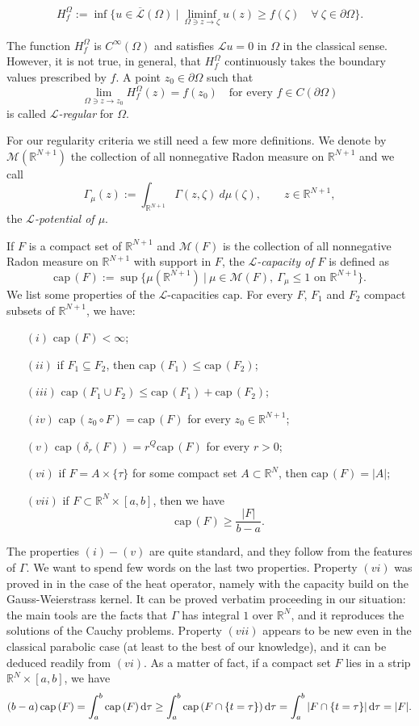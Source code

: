 \documentclass[10pt]{amsart}
\def \RN {\mathbb{R}^N}
\def\elle{\mathcal{L}}
\def\erre{\mathbb{R}}
\def \emme {{\mathcal {M}}}
\def\erreu{{\erre^{ {N+1} }}}
\def\capp{\mathrm{cap\, }}
\newcommand{\tende}{\rightarrow}
\numberwithin{equation}{section}
\begin{document}
$$H_f^\Omega:= \inf\{ u\in {\overline{\elle}} (\Omega) \ | \ \liminf_{\Omega\ni z\tende \zeta} u(z) \geq f(\zeta)\quad \forall\ \zeta\in \partial\Omega\}.$$

The function $H_f^\Omega$ is $C^\infty(\Omega)$ and satisfies $\elle u=0$ in $\Omega$ in the classical sense. However, it is not true, in general, that $H_f^\Omega$ continuously takes the boundary  values prescribed by $f$. A point $z_0\in\partial\Omega$ such that 
 $$\lim_{\Omega\ni z\tende z_0} H_f^\Omega(z)=f(z_0)\quad\mbox{for every }  f\in C(\partial\Omega)$$ is called {\it $\elle$-regular} for $\Omega$.

For our regularity criteria we still need a few more definitions. We denote by $\emme(\erreu)$ the collection of all nonnegative Radon measure on $\erreu$ and we call 
$$\Gamma_\mu(z) :=\int_\erreu \Gamma(z,\zeta)\ d\mu(\zeta),\qquad z\in \erreu,$$ the {\it $\elle$-potential of $\mu$}. 


If $F$ is a compact set of $\erreu$ and $\emme(F)$ is the collection of all nonnegative Radon measure on $\erreu$ with support in $F$,
the {\it $\elle$-capacity of $F$} is defined as
$$\mathrm{cap\, } (F) := \sup\{ \mu(\erreu)\ | \ \mu\in\emme(F), \ \Gamma_\mu \le 1 \mbox{ on } \erreu\}.$$
We list some properties of the $\elle$-capacities $\mathrm{cap}$. For every $F$, $F_1$ and $F_2$ compact subsets of $\erreu$, we have:
\begin{itemize} 
\item[$(i)$] $\capp (F) < \infty $;
\item[$(ii)$] if $F_1\subseteq F_2$, then $\capp (F_1) \le \capp (F_2)$;
\item[$(iii)$] $\capp (F_1 \cup F_2) \le \capp(F_1) + \capp (F_2)$;
\item[$(iv)$] $\capp (z_0 \circ F) = \capp ( F) $ for every $z_0\in\erreu$; 
\item[$(v)$] $\capp (\delta_r (F)) = r^{Q} \capp ( F)$ for every $r>0$;
\item[$(vi)$] if $F=A\times\{\tau\}$ for some compact set $A\subset\RN$, then $\capp (F)=|A|$;
\item[$(vii)$] if $F\subset \RN\times [a,b]$, then we have \begin{equation}\label{capmes}\capp (F)\geq \frac{|F|}{b-a}.\end{equation}
\end{itemize} 
The properties $(i)-(v)$ are quite standard, and they follow from the features of $\Gamma$. We want to spend few words on the last two properties. Property $(vi)$ was proved in \cite[Proposizione 5.1]{L73} in the case of the heat operator, namely with the capacity build on the Gauss-Weierstrass kernel. It can be proved verbatim proceeding in our situation: the main tools are the facts that $\Gamma$ has integral $1$ over $\RN$, and it reproduces the solutions of the Cauchy problems. Property $(vii)$ appears to be new even in the classical parabolic case (at least to the best of our knowledge), and it can be deduced readily from $(vi)$. As a matter of fact, if a compact set $F$ lies in a strip $\RN\times [a,b]$, we have 
$$(b-a)\,\capp(F)=\int_{a}^{b}{\capp(F)\,{\rm d}\tau}\geq\int_{a}^{b}{\capp(F\cap\{t=\tau\})\,{\rm d}\tau}=\int_{a}^{b}{|F\cap\{t=\tau\}|\,{\rm d}\tau}=|F|.$$
\end{document}
